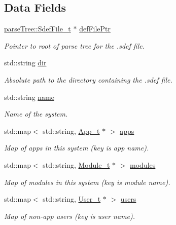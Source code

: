\subsection*{Data Fields}
\begin{DoxyCompactItemize}
\item 
\hyperlink{structparse_tree_1_1_sdef_file__t}{parse\+Tree\+::\+Sdef\+File\+\_\+t} $\ast$ \hyperlink{structmodel_1_1_system__t_a09045fa2228c3df3650f35f149cbb8f8}{def\+File\+Ptr}
\begin{DoxyCompactList}\small\item\em Pointer to root of parse tree for the .sdef file. \end{DoxyCompactList}\item 
std\+::string \hyperlink{structmodel_1_1_system__t_a6d7ea1a18181cf37ecabf08d41879171}{dir}
\begin{DoxyCompactList}\small\item\em Absolute path to the directory containing the .sdef file. \end{DoxyCompactList}\item 
std\+::string \hyperlink{structmodel_1_1_system__t_a4ccbf5d2d0a8e7f647e32cfb9f184ddb}{name}
\begin{DoxyCompactList}\small\item\em Name of the system. \end{DoxyCompactList}\item 
std\+::map$<$ std\+::string, \hyperlink{structmodel_1_1_app__t}{App\+\_\+t} $\ast$ $>$ \hyperlink{structmodel_1_1_system__t_a937e3fdbb57a592f26e1155660e8d095}{apps}
\begin{DoxyCompactList}\small\item\em Map of apps in this system (key is app name). \end{DoxyCompactList}\item 
std\+::map$<$ std\+::string, \hyperlink{structmodel_1_1_module__t}{Module\+\_\+t} $\ast$ $>$ \hyperlink{structmodel_1_1_system__t_a6bac2f3722513c86395f119438b425f6}{modules}
\begin{DoxyCompactList}\small\item\em Map of modules in this system (key is module name). \end{DoxyCompactList}\item 
std\+::map$<$ std\+::string, \hyperlink{structmodel_1_1_user__t}{User\+\_\+t} $\ast$ $>$ \hyperlink{structmodel_1_1_system__t_af5959523824bf081579c1c0e0773bfce}{users}
\begin{DoxyCompactList}\small\item\em Map of non-\/app users (key is user name). \end{DoxyCompactList}\item 

\end{DoxyCompactItemize}
